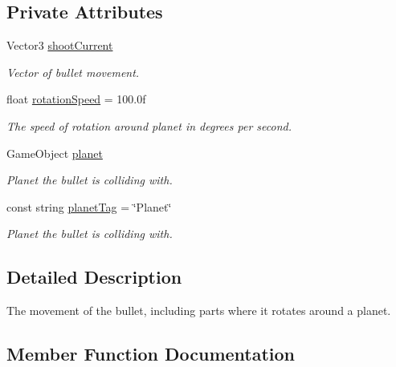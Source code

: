\subsection*{Private Attributes}
\begin{DoxyCompactItemize}
\item 
Vector3 \mbox{\hyperlink{class_bullet_movement_a5419583958b87067b7c8b89b2b1c6b09}{shoot\+Current}}
\begin{DoxyCompactList}\small\item\em Vector of bullet movement. \end{DoxyCompactList}\item 
float \mbox{\hyperlink{class_bullet_movement_a8e039f4911be004e48a1f2620380c15c}{rotation\+Speed}} = 100.\+0f
\begin{DoxyCompactList}\small\item\em The speed of rotation around planet in degrees per second. \end{DoxyCompactList}\item 
Game\+Object \mbox{\hyperlink{class_bullet_movement_a93263de8f413e1abcbf57f3b30b37e50}{planet}}
\begin{DoxyCompactList}\small\item\em Planet the bullet is colliding with. \end{DoxyCompactList}\item 
const string \mbox{\hyperlink{class_bullet_movement_a8a39e066bf0f84fd7ec143eea687ab12}{planet\+Tag}} = \char`\"{}Planet\char`\"{}
\begin{DoxyCompactList}\small\item\em Planet the bullet is colliding with. \end{DoxyCompactList}\end{DoxyCompactItemize}


\subsection{Detailed Description}
The movement of the bullet, including parts where it rotates around a planet. 



\subsection{Member Function Documentation}
\mbox{\label{class_bullet_movement_ab6f9452d6eefa893c167e52c285d7ce9}} 
